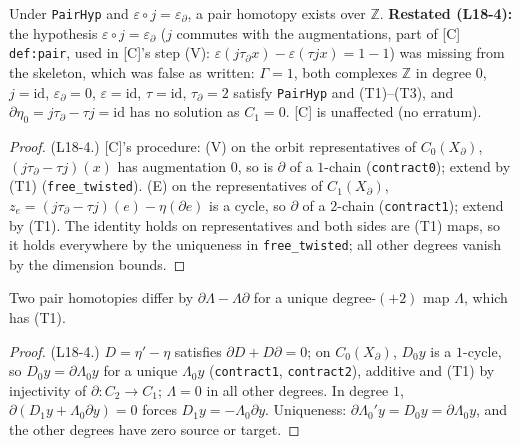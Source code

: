 \begin{lemma}\label{lem:etaexists}
  \leanok
  Under \texttt{PairHyp} and $\varepsilon\circ j=\varepsilon_\partial$, a pair homotopy exists over $\mathbb Z$. \textbf{Restated
  (L18-4):} the hypothesis $\varepsilon\circ j=\varepsilon_\partial$ ($j$ commutes with the augmentations, part of [C]
  \texttt{def:pair}, used in [C]'s step (V): $\varepsilon(j\tau_\partial x)-\varepsilon(\tau jx)=1-1$) was missing from the
  skeleton, which was false as written: $\Gamma=1$, both complexes $\mathbb Z$ in degree $0$, $j=\mathrm{id}$, $\varepsilon_\partial=0$,
  $\varepsilon=\mathrm{id}$, $\tau=\mathrm{id}$, $\tau_\partial=2$ satisfy \texttt{PairHyp} and (T1)--(T3), and
  $\partial\eta_0=j\tau_\partial-\tau j=\mathrm{id}$ has no solution as $C_1=0$. [C] is unaffected (no erratum).
\end{lemma}
\begin{proof}
  \leanok
  (L18-4.) [C]'s procedure: (V) on the orbit representatives of $C_0(X_\partial)$, $(j\tau_\partial-\tau j)(x)$ has augmentation
  $0$, so is $\partial$ of a $1$-chain (\texttt{contract0}); extend by (T1) (\texttt{free\_twisted}). (E) on the representatives
  of $C_1(X_\partial)$, $z_e=(j\tau_\partial-\tau j)(e)-\eta(\partial e)$ is a cycle, so $\partial$ of a $2$-chain
  (\texttt{contract1}); extend by (T1). The identity holds on representatives and both sides are (T1) maps, so it holds
  everywhere by the uniqueness in \texttt{free\_twisted}; all other degrees vanish by the dimension bounds.
\end{proof}

\begin{lemma}\label{lem:etaunique}
  \leanok
  Two pair homotopies differ by $\partial\Lambda-\Lambda\partial$ for a unique degree-$(+2)$ map $\Lambda$, which has (T1).
\end{lemma}
\begin{proof}
  \leanok
  (L18-4.) $D=\eta'-\eta$ satisfies $\partial D+D\partial=0$; on $C_0(X_\partial)$, $D_0y$ is a $1$-cycle, so $D_0y=\partial\Lambda_0y$
  for a unique $\Lambda_0y$ (\texttt{contract1}, \texttt{contract2}), additive and (T1) by injectivity of
  $\partial\colon C_2\to C_1$; $\Lambda=0$ in all other degrees. In degree $1$, $\partial(D_1y+\Lambda_0\partial y)=0$ forces
  $D_1y=-\Lambda_0\partial y$. Uniqueness: $\partial\Lambda_0'y=D_0y=\partial\Lambda_0y$, and the other degrees have zero source
  or target.
\end{proof}

